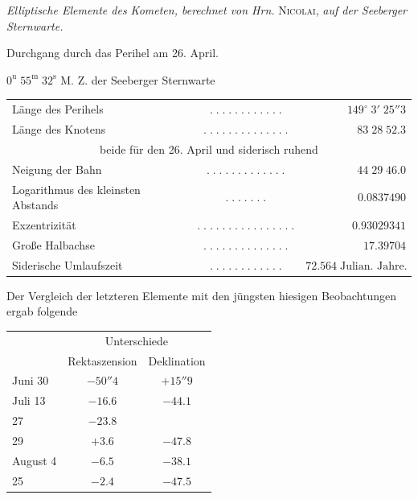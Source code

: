 \begin{center}
\emph{Elliptische Elemente des Kometen, berechnet von Hrn.} \textsc{Nicolai}, \emph{auf der Seeberger Sternwarte.}
\end{center}

\begin{center}\fontsize{10}{12}\selectfont Durchgang durch das Perihel am 26. April.\par $0^{\mathrm u}\;55^{\mathrm m}\;32^{\mathrm s}$ M. Z. der Seeberger Sternwarte\end{center}
\begin{center}\fontsize{9}{11}\selectfont\setlength{\tabcolsep}{2pt}\renewcommand{\arraystretch}{1.15}\begin{tabular}{lcr}
Länge des Perihels & $.\;.\;.\;.\;.\;.\;.\;.\;.\;.\;.\;.$ & $149^\circ\;3'\;25''3$\\
Länge des Knotens & $.\;.\;.\;.\;.\;.\;.\;.\;.\;.\;.\;.\;.\;.$ & $83\;28\;52.3$\\
\multicolumn{3}{c}{beide für den 26. April und siderisch ruhend}\\
Neigung der Bahn & $.\;.\;.\;.\;.\;.\;.\;.\;.\;.\;.\;.\;.$ & $44\;29\;46.0$\\
Logarithmus des kleinsten Abstands & $.\;.\;.\;.\;.\;.\;.$ & $0.0837490$\\
Exzentrizität & $.\;.\;.\;.\;.\;.\;.\;.\;.\;.\;.\;.\;.\;.\;.\;.$ & $0.93029341$\\
Große Halbachse & $.\;.\;.\;.\;.\;.\;.\;.\;.\;.\;.\;.\;.\;.$ & $17.39704$\\
Siderische Umlaufszeit & $.\;.\;.\;.\;.\;.\;.\;.\;.\;.\;.\;.$ & $72.564\;\text{Julian. Jahre.}$\\
\end{tabular}\end{center}

\begingroup\setlength{\rightskip}{0pt plus 1em}\par\indent Der Vergleich der letzteren Elemente mit den jüngsten hiesigen Beobachtungen ergab folgende\par\endgroup

\begin{center}
\fontsize{10}{12}\selectfont\setlength{\tabcolsep}{9pt}\renewcommand{\arraystretch}{1.15}\begin{tabular}{l | c | c}
& \multicolumn{2}{c}{Unterschiede} \\
& Rektaszension & Deklination \\
\hline
Juni 30 & $-50''4$ & $+15''9$ \\
Juli 13 & $-16.6$ & $-44.1$ \\
27 & $-23.8$ & \\
29 & $+3.6$ & $-47.8$ \\
August 4 & $-6.5$ & $-38.1$ \\
25 & $-2.4$ & $-47.5$ \\
\end{tabular}
\end{center}

